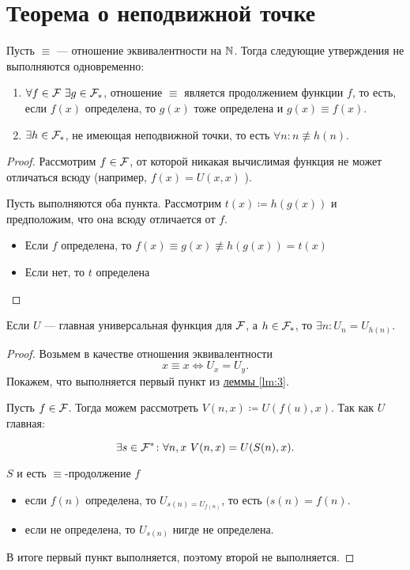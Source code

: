 \section{Теорема о неподвижной точке}

\begin{lm}\label{lm:3}
    Пусть $ \equiv $ --- отношение эквивалентности на $ \mathbb{N}$. Тогда следующие утверждения не выполняются одновременно:
	\begin{enumerate}
		\item $ \forall f \in \mathcal{F} ~ \exists g \in \mathcal{F}_{*}$, отношение $ \equiv  $ является продолжением функции $ f$, то есть, если $ f(x) $ определена, то  $ g(x)$ тоже определена и $ g(x) \equiv f(x)$.
		\item $ \exists h \in \mathcal{F}_{*}$, не имеющая неподвижной точки, то есть $ \forall n \colon n \not\equiv h\left( n \right) $.
	\end{enumerate} 
\end{lm}
\begin{proof}
	Рассмотрим $ f \in \mathcal{F}$, от которой никакая вычислимая функция не может отличаться всюду (например,  $ f(x) = U(x, x)$ ).

	Пусть выполняются оба пункта. Рассмотрим $ t(x) \coloneqq h(g(x))$ и предположим, что она всюду отличается от $ f$.
	\begin{itemize}
		\item Если $ f$ определена, то $ f(x) \equiv g(  x )  \not\equiv  h(g(x)) = t(x)$ 
		\item Если нет, то $ t$ определена
	\end{itemize}
\end{proof}
\begin{thm}
	Если $ U$ --- главная универсальная функция для $ \mathcal{F}$, а $ h \in \mathcal{F}_{*}$, то $ \exists n \colon U_n = U_{h(n)}$.
\end{thm}
\begin{proof}
    Возьмем в качестве отношения эквивалентности
	\[
	x \equiv x \Longleftrightarrow U_x = U_y
	.\] 
	Покажем, что выполняется первый пункт из \href{lm:3}{леммы \ref{lm:3}}.

	Пусть $ f \in \mathcal{F}$. Тогда можем рассмотреть $ V(n, x) \coloneqq U(f(u), x)$. 
	Так как $ U$ главная:

	\[
		\exists s \in \mathcal{F}^{*} \colon  \forall n, x ~V(n, x) = U(S(n), x)
	.\] 

	$ S $ и есть $ \equiv $-продолжение $ f$
	\begin{itemize}
		\item если $ f(n)$ определена, то $ U_{s(n) = U_{f(n)}}$, то есть $ (s(n) = f(n)$.
		\item если не определена, то $ U_{s(n)}$ нигде не определена.
	\end{itemize}

	В итоге первый пункт выполняется, поэтому второй не выполняется.
\end{proof}
